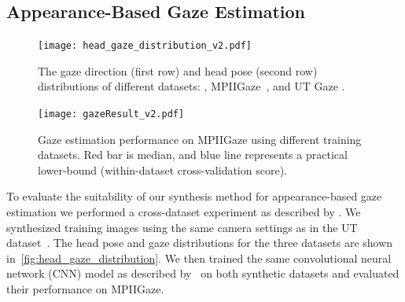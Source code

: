 

\subsection{Appearance-Based Gaze Estimation}




\begin{figure}
    \centering
    \texttt{[image: head\_gaze\_distribution\_v2.pdf]}
    \caption{The gaze direction (first row) and head pose (second row) distributions of different datasets: \dataset, MPIIGaze~\cite{zhang15_cvpr}, and UT Gaze \cite{sugano2014learning}.}
    \label{fig:head_gaze_distribution}
\end{figure}

\begin{figure}
    \centering
    \texttt{[image: gazeResult\_v2.pdf]}
    \caption{Gaze estimation performance on MPIIGaze using different training datasets. Red bar is median, and blue line represents a practical lower-bound (within-dataset cross-validation score).
    }
    \label{fig:gazeResult}
\end{figure}

To evaluate the suitability of our synthesis method for appearance-based gaze estimation we performed a cross-dataset experiment as described by \citet{zhang15_cvpr}.
We synthesized training images using the same camera settings as in the UT dataset~\cite{sugano2014learning}.
The head pose and gaze distributions for the three datasets are shown in~\autoref{fig:head_gaze_distribution}.
We then trained the same convolutional neural network (CNN) model as described by~\citet{zhang15_cvpr} on both synthetic datasets and evaluated their performance on MPIIGaze.

